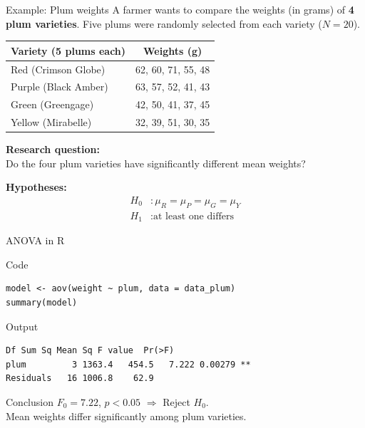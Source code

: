 \documentclass[aspectratio=169]{beamer}
\begin{document}
\begin{frame}[fragile]{Example: Plum weights}
A farmer wants to compare the weights (in grams) of \textbf{4 plum varieties}.
Five plums were randomly selected from each variety ($N = 20$).

\begin{center}
\footnotesize
\begin{tabular}{lc}
\hline
Variety (5 plums each) & Weights (g) \\
\hline
Red (Crimson Globe)    & 62, 60, 71, 55, 48 \\
Purple (Black Amber)   & 63, 57, 52, 41, 43 \\
Green (Greengage)      & 42, 50, 41, 37, 45 \\
Yellow (Mirabelle)     & 32, 39, 51, 30, 35 \\
\hline
\end{tabular}
\end{center}

\textbf{Research question:}\\
Do the four plum varieties have significantly different mean weights?
\vspace{8pt}

\textbf{Hypotheses:}
\[
\begin{aligned}
H_0 &: \mu_R = \mu_P = \mu_G = \mu_Y \\
H_1 &: \text{at least one differs}
\end{aligned}
\]
\end{frame}

\begin{frame}[fragile]{ANOVA in R}
\begin{block}{Code}
\begin{lstlisting}
model <- aov(weight ~ plum, data = data_plum)
summary(model)
\end{lstlisting}
\end{block}

\begin{exampleblock}{Output}
\begin{lstlisting}[numbers=none]
            Df Sum Sq Mean Sq F value  Pr(>F)
plum         3 1363.4   454.5   7.222 0.00279 **
Residuals   16 1006.8    62.9
\end{lstlisting}
\end{exampleblock}

\begin{alertblock}{Conclusion}
$F_0 = 7.22$, $p < 0.05$ $\Rightarrow$ Reject $H_0$. \\
Mean weights differ significantly among plum varieties.
\end{alertblock}
\end{frame}
\end{document}
